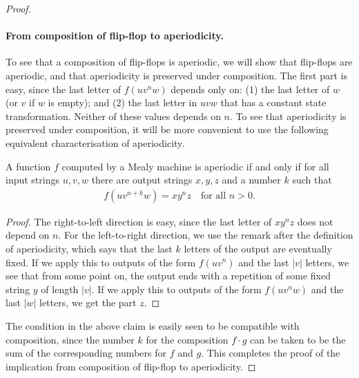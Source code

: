 \begin{proof}
\paragraph*{From composition of flip-flop to aperiodicity.} To see that a composition of flip-flops is aperiodic, we will show that flip-flops are aperiodic, and that aperiodicity is preserved under composition.  The first part is easy, since the last letter of $f(uv^nw)$ depends only on: (1) the last letter of $w$ (or $v$ if $w$ is empty); and (2) the last letter in $uvw$ that has a constant state transformation. Neither of these values depends on $n$. To see that aperiodicity is preserved under composition, it will be more convenient to use the following equivalent characterisation of aperiodicity.
\begin{claim}\label{claim:aperiodic-pumping}
    A function  $f$ computed by a Mealy machine is aperiodic if and only if for all input strings $u,v,w$ there are output strings $x,y,z$ and a number $k$ such that
    \begin{align*}
    f(uv^{n+k}w) =  xy^n z \quad \text{for all $n > 0$}.
    \end{align*}
\end{claim}
\begin{proof}
    The right-to-left direction is easy, since the last letter of $xy^nz$ does not depend on $n$. For the left-to-right direction, we use the remark after the definition of aperiodicity, which says that the last $k$ letters of the output  are eventually fixed. If we apply this to outputs of the form $f(uv^n)$ and the last $|v|$ letters,  we see that  from some point on, the output ends with a repetition of some fixed string $y$ of length $|v|$. If we apply this to outputs of the form $f(uv^nw)$ and the last $|w|$ letters, we get the part $z$.
\end{proof}
The condition in the above claim is easily seen to be compatible with composition, since the number $k$ for the composition $f \cdot g$ can be taken to be the sum of the corresponding numbers for $f$ and $g$. This completes the proof of the implication from composition of flip-flop to aperiodicity.




\end{proof}
